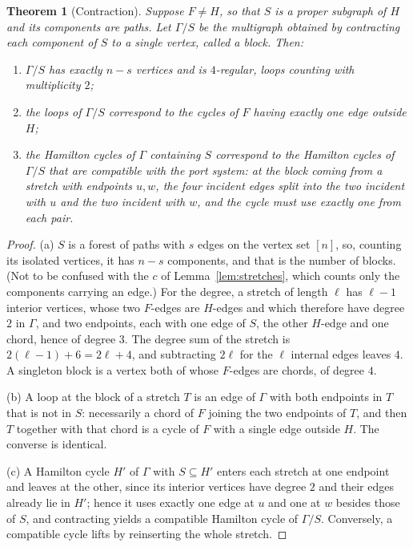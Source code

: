 \documentclass[11pt,a4paper]{article}
\newtheorem{theorem}{Theorem}[section]
\theoremstyle{definition}
\theoremstyle{remark}
\begin{document}
\begin{theorem}[Contraction]\label{thm:contraction}
Suppose $F\ne H$, so that $S$ is a proper subgraph of $H$ and its components are paths. Let $\Gamma/S$ be the multigraph obtained by contracting each component of $S$ to a single vertex, called a \emph{block}. Then:
\begin{enumerate}[label=(\alph*)]
\item $\Gamma/S$ has exactly $n-s$ vertices and is $4$-regular, loops counting with multiplicity $2$;
\item the loops of $\Gamma/S$ correspond to the cycles of $F$ having exactly one edge outside $H$;
\item the Hamilton cycles of $\Gamma$ containing $S$ correspond to the Hamilton cycles of $\Gamma/S$ that are \emph{compatible} with the port system: at the block coming from a stretch with endpoints $u,w$, the four incident edges split into the two incident with $u$ and the two incident with $w$, and the cycle must use exactly one from each pair.
\end{enumerate}
\end{theorem}

\begin{proof}
(a) $S$ is a forest of paths with $s$ edges on the vertex set $[n]$, so, counting its isolated vertices, it has $n-s$ components, and that is the number of blocks. (Not to be confused with the $c$ of Lemma~\ref{lem:stretches}, which counts only the components carrying an edge.) For the degree, a stretch of length $\ell$ has $\ell-1$ interior vertices, whose two $F$-edges are $H$-edges and which therefore have degree $2$ in $\Gamma$, and two endpoints, each with one edge of $S$, the other $H$-edge and one chord, hence of degree $3$. The degree sum of the stretch is $2(\ell-1)+6=2\ell+4$, and subtracting $2\ell$ for the $\ell$ internal edges leaves $4$. A singleton block is a vertex both of whose $F$-edges are chords, of degree $4$.

(b) A loop at the block of a stretch $T$ is an edge of $\Gamma$ with both endpoints in $T$ that is not in $S$: necessarily a chord of $F$ joining the two endpoints of $T$, and then $T$ together with that chord is a cycle of $F$ with a single edge outside $H$. The converse is identical.

(c) A Hamilton cycle $H'$ of $\Gamma$ with $S\subseteq H'$ enters each stretch at one endpoint and leaves at the other, since its interior vertices have degree $2$ and their edges already lie in $H'$; hence it uses exactly one edge at $u$ and one at $w$ besides those of $S$, and contracting yields a compatible Hamilton cycle of $\Gamma/S$. Conversely, a compatible cycle lifts by reinserting the whole stretch.
\end{proof}
\end{document}
